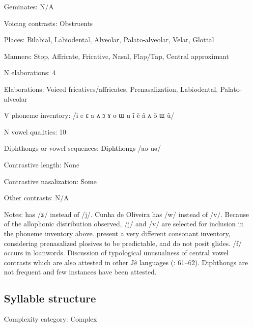 {\begin{appendixdesc}
\item[Geminates:] N/A

\item[Voicing contrasts:] Obstruents

\item[Places:] Bilabial, Labiodental, Alveolar, Palato-alveolar, Velar, Glottal

\item[Manners:] Stop, Affricate, Fricative, Nasal, Flap/Tap, Central approximant

\item[N elaborations:] 4

\item[Elaborations:] Voiced fricatives/affricates, Prenasalization, Labiodental, Palato-alveolar

\item[V phoneme inventory:] /i e ɛ a ʌ ɔ ɤ o ɯ u ĩ ẽ ã ʌ õ ɯ ũ/

\item[N vowel qualities:] 10

\item[Diphthongs or vowel sequences:] Diphthongs /ao uə/

\item[Contrastive length:] None

\item[Contrastive nasalization:] Some

\item[Other contrasts:] N/A

\item[Notes:] \citet{Ham2009} has /ʑ/ instead of /j/. Cunha de Oliveira has /w/ instead of /v/. Because of the allophonic distribution observed, /j/ and /v/ are selected for inclusion in the phoneme inventory above. \citet{BurgessHam1968} present a very different consonant inventory, considering prenasalized plosives to be predictable, and do not posit glides. /f/ occurs in loanwords. Discussion of typological unusualness of central vowel contrasts which are also attested in other Jê languages (\citealt{CunhadeOliveira2005}: 61--62). Diphthongs are not frequent and few instances have been attested.
\end{appendixdesc}
\subsection*{Syllable structure}
\begin{appendixdesc}

\item[Complexity category:] Complex


\end{appendixdesc}}
